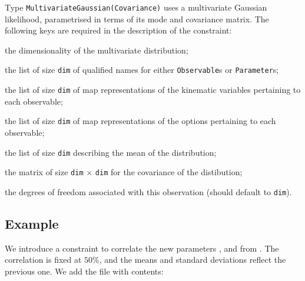 Type \texttt{MultivariateGaussian(Covariance)} uses a multivariate Gaussian
likelihood, parametrised in terms of its mode and covariance matrix. The
following keys are required in the description of the constraint:
\begin{description}[labelwidth=.15\textwidth]
    \item[\texttt{dim}] the dimensionality of the multivariate distribution;
    \item[\texttt{observable}] the list of size \texttt{dim} of qualified names for either \texttt{Observable}s or \texttt{Parameter}s;
    \item[\texttt{kinematics}] the list of size \texttt{dim} of map representations of the kinematic variables pertaining to each observable;
    \item[\texttt{options}] the list of size \texttt{dim} of map representations of the options pertaining to each observable;
    \item[\texttt{mean}] the list of size \texttt{dim} describing the mean of the distribution;
    \item[\texttt{covariance}] the matrix of size \texttt{dim} $\times$ \texttt{dim} for the covariance of the distibution;
    \item[\texttt{dof}] the degrees of freedom associated with this observation (should default to \texttt{dim}).
\end{description}

\subsection*{Example}

We introduce a constraint to correlate the new parameters
, and  from
. The correlation is fixed at $50\%$, and the means
and standard deviations reflect the previous one. We add the file
 with contents:
